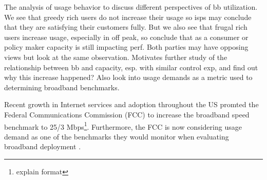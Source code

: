 The analysis of usage behavior to discuss different perspectives of bb utilization. We see that greedy rich users do not increase their usage so isps may conclude that they are satisfying their customers fully. But we also see that frugal rich users increase usage, especially in off peak, so conclude that as a consumer or policy maker capacity is still impacting perf. Both parties may have opposing views but look at the same observation. Motivates further study of the relationship between bb and capacity, esp. with similar control exp, and find out why this increase happened? Also look into usage demands as a metric used to determining broadband benchmarks.

Recent growth in Internet services and adoption throughout the US promted the Federal Communications Commission (FCC) to increase the broadband speed benchmark to 25/3 Mbps\footnote{explain format}. Furthermore, the FCC is now considering usage demand as one of the benchmarks they would monitor when evaluating broadband deployment \cite{fcc2015broadband-report}.
